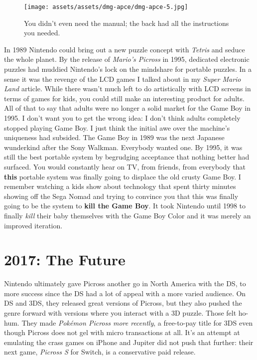 \documentclass{book}
\begin{document}
\begin{figure}[hbt]
\vskip 10pt
\centering \texttt{[image: assets/assets/dmg-apce/dmg-apce-5.jpg]}\par\pagetwodescription You didn’t even need the manual; the back had all the instructions you needed.
\vskip 6pt
\end{figure}

In 1989 Nintendo could bring out a new puzzle concept with \emph{Tetris} and seduce the whole planet. By the release of \emph{Mario’s Picross} in 1995, dedicated electronic puzzles had muddied Nintendo’s lock on the mindshare for portable puzzles. In a sense it was the revenge of the LCD games I talked about in my \emph{Super Mario Land} article. While there wasn’t much left to do artistically with LCD screens in terms of games for kids, you could still make an interesting product for adults. All of that to say that adults were no longer a solid market for the Game Boy in 1995. I don’t want you to get the wrong idea: I don’t think adults completely stopped playing Game Boy. I just think the initial awe over the machine’s uniqueness had subsided. The Game Boy in 1989 was the next Japanese wunderkind after the Sony Walkman. Everybody wanted one. By 1995, it was still the best portable system by begrudging acceptance that nothing better had surfaced. You would constantly hear on TV, from friends, from everybody that \textbf{this} portable system was finally going to displace the old crusty Game Boy. I remember watching a kids show about technology that spent thirty minutes showing off the Sega Nomad and trying to convince you that this was finally going to be the system to \textbf{kill the Game Boy}. It took Nintendo until 1998 to finally \emph{kill} their baby themselves with the Game Boy Color and it was merely an improved iteration.

\FloatBarrier\needspace{10mm}\section*{2017: The Future}\nopagebreak[4]

Nintendo ultimately gave Picross another go in North America with the DS, to more success since the DS had a lot of appeal with a more varied audience. On DS and 3DS, they released great versions of Picross, but they also pushed the genre forward with versions where you interact with a 3D puzzle. Those felt ho-hum. They made \emph{Pokémon Picross more recently}, a free-to-pay title for 3DS even though Picross does not gel with micro transactions at all. It’s an attempt at emulating the crass games on iPhone and Jupiter did not push that further: their next game, \emph{Picross S} for Switch, is a conservative paid release.
\end{document}
